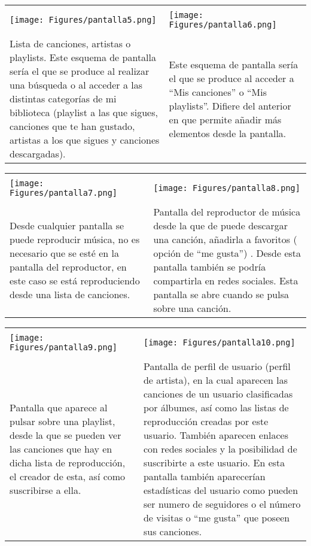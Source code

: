 \begin{tabular}{ p{6cm} p{6cm}}
\hline
\\
\texttt{[image: Figures/pantalla5.png]}
&
\texttt{[image: Figures/pantalla6.png]} \\
\hline
\\
Lista de canciones, artistas o playlists. Este esquema de pantalla sería el que se produce al realizar una búsqueda o al acceder a las distintas categorías de mi biblioteca (playlist a las que sigues, canciones que te han gustado, artistas a los que sigues y canciones descargadas).
&
Este esquema de pantalla sería el que se produce al acceder a “Mis canciones” o “Mis playlists”.
Difiere del anterior en que permite añadir más elementos desde la pantalla. \\
\hline
\end{tabular}

\begin{tabular}{ p{6cm} p{6cm}}
\hline
\\
\texttt{[image: Figures/pantalla7.png]}
&
\texttt{[image: Figures/pantalla8.png]} \\
\hline
\\
Desde cualquier pantalla se puede reproducir música, no es necesario que se esté en la pantalla del reproductor, en este caso se está reproduciendo desde una lista de canciones.
&
Pantalla del reproductor de música desde la que de puede descargar una canción, añadirla a favoritos ( opción de “me gusta”) . Desde esta pantalla también se podría compartirla en redes sociales. 
Esta pantalla se abre cuando se pulsa sobre una canción. \\
\hline
\end{tabular}

\begin{tabular}{ p{6cm} p{6cm}}
\hline
\\
\texttt{[image: Figures/pantalla9.png]}
&
\texttt{[image: Figures/pantalla10.png]} \\
\hline
\\
Pantalla que aparece al pulsar sobre una playlist, desde la que se pueden ver las canciones que hay en dicha lista de reproducción, el creador de esta, así como suscribirse a ella.
&
Pantalla de perfil de usuario (perfil de artista), en la cual aparecen las canciones de un usuario clasificadas por álbumes, así como las listas de reproducción creadas por este usuario. También aparecen enlaces con redes sociales y la posibilidad de suscribirte a este usuario.
En esta pantalla también aparecerían estadísticas del usuario como pueden ser numero de seguidores o el número de visitas o “me gusta” que poseen sus canciones.  
\\
\hline
\end{tabular}

